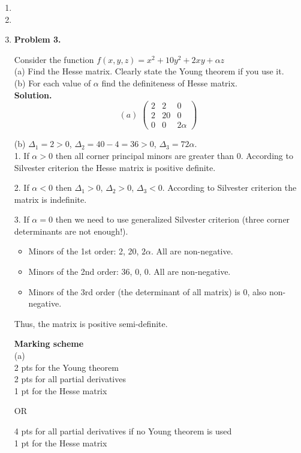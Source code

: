 \begin{enumerate}
  \item
  \item
  \item \textbf{Problem 3.}

  Consider the function $f(x,y,z)=x^2+10y^2+2xy+\alpha z$\\
  (a) Find the Hesse matrix. Clearly state the Young theorem if you use it.\\
  (b) For each value of $\alpha$ find the definiteness of Hesse matrix.\\

  \textbf{Solution.}
   $$(a)\; \begin{pmatrix}
  2& 2 &0\\
  2 &20& 0\\
  0& 0& 2\alpha
  \end{pmatrix}$$

  (b) $\Delta_1=2>0$, $\Delta_2=40-4=36>0$, $\Delta_3=72\alpha$.\\
  1. If $\alpha >0$ then all corner principal minors are greater than 0. According to Silvester criterion the Hesse matrix is positive definite.

  2. If $\alpha<0$ then $\Delta_1>0$, $\Delta_2>0$, $\Delta_3<0$. According to Silvester criterion the matrix is indefinite.

  3. If $\alpha=0$ then we need to use generalized Silvester criterion (three corner determinants are not enough!).

  \begin{itemize}
  \item Minors of the 1st order: 2, 20, $2\alpha$. All are non-negative.
  \item Minors of the 2nd order: 36, 0, 0. All are non-negative.
  \item Minors of the 3rd order (the determinant of all matrix) is 0, also non-negative.
  \end{itemize}

  Thus, the matrix is positive semi-definite.
  \smallskip

  \textbf{Marking scheme}\\
  (a)\\
  2 pts for the Young theorem\\
  2 pts for all partial derivatives\\
  1 pt for the Hesse matrix

  OR

  4 pts for all partial derivatives if no Young theorem is used\\
  1 pt for the Hesse matrix


\end{enumerate}
